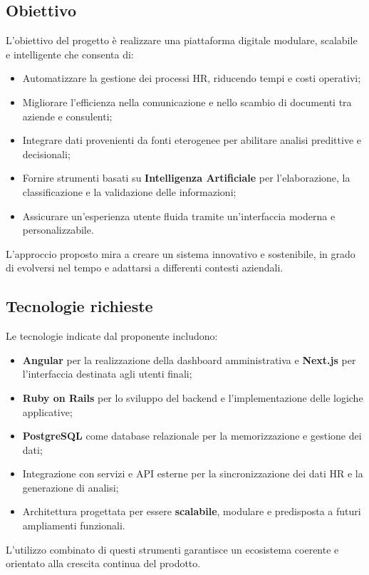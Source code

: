 \documentclass[a4paper,12pt]{article}
\begin{document}
{{{    \subsection{Obiettivo}
        L’obiettivo del progetto è realizzare una piattaforma digitale modulare, scalabile e intelligente che consenta di:
        \begin{itemize}
            \item Automatizzare la gestione dei processi HR, riducendo tempi e costi operativi;
            \item Migliorare l’efficienza nella comunicazione e nello scambio di documenti tra aziende e consulenti;
            \item Integrare dati provenienti da fonti eterogenee per abilitare analisi predittive e decisionali;
            \item Fornire strumenti basati su \textbf{Intelligenza Artificiale} per l’elaborazione, la classificazione e la validazione delle informazioni;
            \item Assicurare un’esperienza utente fluida tramite un’interfaccia moderna e personalizzabile.
        \end{itemize}
        L’approccio proposto mira a creare un sistema innovativo e sostenibile, in grado di evolversi nel tempo e adattarsi a differenti contesti aziendali.
    

    \subsection{Tecnologie richieste}
        Le tecnologie indicate dal proponente includono:
        \begin{itemize}
            \item \textbf{Angular} per la realizzazione della dashboard amministrativa e \textbf{Next.js} per l’interfaccia destinata agli utenti finali;
            \item \textbf{Ruby on Rails} per lo sviluppo del backend e l’implementazione delle logiche applicative;
            \item \textbf{PostgreSQL} come database relazionale per la memorizzazione e gestione dei dati;
            \item Integrazione con servizi e API esterne per la sincronizzazione dei dati HR e la generazione di analisi;
            \item Architettura progettata per essere \textbf{scalabile}, modulare e predisposta a futuri ampliamenti funzionali.
        \end{itemize}
        L’utilizzo combinato di questi strumenti garantisce un ecosistema coerente e orientato alla crescita continua del prodotto.
    

}}}
\end{document}
